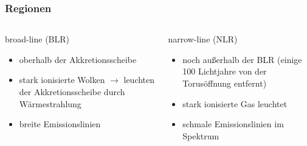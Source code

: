 \documentclass[aspectratio=1610, 9pt]{beamer}
\begin{document}
\begin{frame}\frametitle{Regionen}
  \begin{columns}
  \begin{column}[c]{0.45\textwidth}
    \begin{block}{broad-line (BLR)}
    \begin{itemize}
      \item oberhalb der Akkretionsscheibe
      \item stark ionisierte Wolken $\to$ leuchten der Akkretionsscheibe durch W\"armestrahlung
      \item breite Emissionslinien
    \end{itemize}
    \end{block}
    \end{column}
    \begin{column}[c]{0.45\textwidth}
    \begin{block}{narrow-line (NLR)}
    \begin{itemize}
      \item noch au\ss erhalb der BLR (einige 100 Lichtjahre von der Torus\"offnung entfernt)
      \item stark ionisierte Gas leuchtet
      \item schmale Emissionslinien im Spektrum
    \end{itemize}
    \end{block}
    \end{column}
  \end{columns}
\end{frame}
\end{document}
